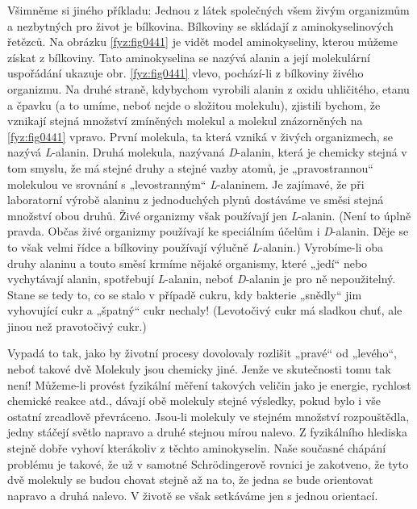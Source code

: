     Všimněme si jiného příkladu: Jednou z látek společných všem živým organizmům a nezbytných pro
    život je bílkovina. Bílkoviny se skládají z aminokyselinových řetězců. Na obrázku
    \ref{fyz:fig0441} je vidět model aminokyseliny, kterou můžeme získat z bílkoviny. Tato
    aminokyselina se nazývá alanin a její molekulární uspořádání ukazuje obr. \ref{fyz:fig0441}
    vlevo, pochází-li z bílkoviny živého organizmu. Na druhé straně, kdybychom vyrobili alanin z
    oxidu uhličitého, etanu a čpavku (a to umíme, neboť nejde o složitou molekulu), zjistili bychom,
    že vznikají stejná množství zmíněných molekul a molekul znázorněných na \ref{fyz:fig0441}
    vpravo. První molekula, ta která vzniká v živých organizmech, se nazývá \emph{L}-alanin. Druhá
    molekula, nazývaná \emph{D}-alanin, která je chemicky stejná v tom smyslu, že má stejné druhy a
    stejné vazby atomů, je „pravostrannou“ molekulou ve srovnání s „levostranným“
    \emph{L}-alaninem. Je zajímavé, že při laboratorní výrobě alaninu z jednoduchých plynů dostáváme
    ve směsi stejná množství obou druhů. Živé organizmy však používají jen \emph{L}-alanin. (Není to
    úplně pravda. Občas živé organizmy používají ke speciálním účelům i \emph{D}-alanin. Děje se to
    však velmi řídce a bílkoviny používají výlučně \emph{L}-alanin.) Vyrobíme-li oba druhy alaninu a
    touto směsí krmíme nějaké organismy, které „jedí“ nebo vychytávají alanin, spotřebují
    \emph{L}-alanin, neboť \emph{D}-alanin je pro ně nepoužitelný. Stane se tedy to, co se stalo v
    případě cukru, kdy bakterie „snědly“ jim vyhovující cukr a „špatný“ cukr nechaly! (Levotočivý
    cukr má sladkou chuť, ale jinou než pravotočivý cukr.)

    Vypadá to tak, jako by životní procesy dovolovaly rozlišit „pravé“ od „levého“, neboť takové dvě
    Molekuly jsou chemicky jiné. Jenže ve skutečnosti tomu tak není! Můžeme-li provést fyzikální
    měření takových veličin jako je energie, rychlost chemické reakce atd., dávají obě molekuly
    stejné výsledky, pokud bylo i vše ostatní zrcadlově převráceno. Jsou-li molekuly ve stejném
    množství rozpouštědla, jedny stáčejí světlo napravo a druhé stejnou mírou nalevo. Z fyzikálního
    hlediska stejně dobře vyhoví kterákoliv z těchto aminokyselin. Naše současné chápání problému je
    takové, že už v samotné Schrödingerově rovnici je zakotveno, že tyto dvě molekuly se budou
    chovat stejně až na to, že jedna se bude orientovat napravo a druhá nalevo. V životě se však
    setkáváme jen s jednou orientací.

